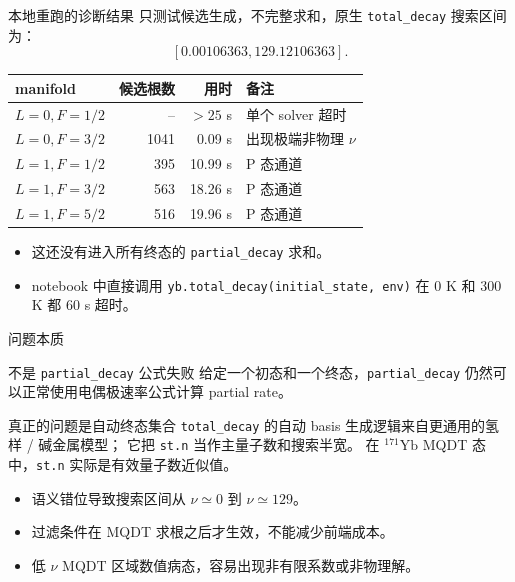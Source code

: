 \documentclass[aspectratio=169,11pt]{ctexbeamer}
\begin{document}
\begin{frame}{本地重跑的诊断结果}
  只测试候选生成，不完整求和，原生 \texttt{total\_decay} 搜索区间为：
  \[
    [0.00106363,129.12106363].
  \]

  \begin{table}
    \centering
    \scriptsize
    \begin{tabular}{lrrl}
      \toprule
      manifold & 候选根数 & 用时 & 备注 \\
      \midrule
      \(L=0,F=1/2\) & -- & \(>25\) s & 单个 solver 超时 \\
      \(L=0,F=3/2\) & 1041 & 0.09 s & 出现极端非物理 \(\nu\) \\
      \(L=1,F=1/2\) & 395 & 10.99 s & P 态通道 \\
      \(L=1,F=3/2\) & 563 & 18.26 s & P 态通道 \\
      \(L=1,F=5/2\) & 516 & 19.96 s & P 态通道 \\
      \bottomrule
    \end{tabular}
  \end{table}

  \begin{itemize}
    \item 这还没有进入所有终态的 \texttt{partial\_decay} 求和。
    \item notebook 中直接调用 \texttt{yb.total\_decay(initial\_state, env)} 在 0 K 和 300 K 都 60 s 超时。
  \end{itemize}
\end{frame}

\begin{frame}{问题本质}
  \begin{block}{不是 \texttt{partial\_decay} 公式失败}
    给定一个初态和一个终态，\texttt{partial\_decay} 仍然可以正常使用电偶极速率公式计算 partial rate。
  \end{block}

  \begin{block}{真正的问题是自动终态集合}
    \texttt{total\_decay} 的自动 basis 生成逻辑来自更通用的氢样 / 碱金属模型；
    它把 \texttt{st.n} 当作主量子数和搜索半宽。
    在 \({}^{171}\mathrm{Yb}\) MQDT 态中，\texttt{st.n} 实际是有效量子数近似值。
  \end{block}

  \begin{itemize}
    \item 语义错位导致搜索区间从 \(\nu\simeq0\) 到 \(\nu\simeq129\)。
    \item 过滤条件在 MQDT 求根之后才生效，不能减少前端成本。
    \item 低 \(\nu\) MQDT 区域数值病态，容易出现非有限系数或非物理解。
  \end{itemize}
\end{frame}
\end{document}
